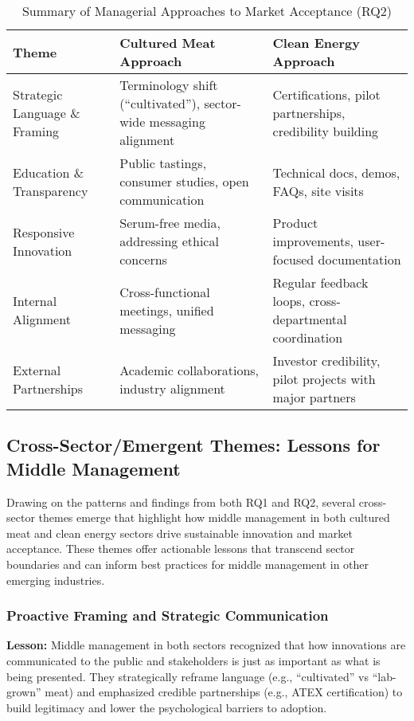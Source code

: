 \begin{table}[h!]
	\centering
	\caption{Summary of Managerial Approaches to Market Acceptance (RQ2)}
	\label{tab:rq2_summary}
	\begin{tabularx}{\textwidth}{@{}lXX@{}}
		\toprule
		\textbf{Theme} & \textbf{Cultured Meat Approach} & \textbf{Clean Energy Approach} \\
		\midrule
		Strategic Language \& Framing & Terminology shift (“cultivated”), sector-wide messaging alignment & Certifications, pilot partnerships, credibility building \\
		\addlinespace
		Education \& Transparency & Public tastings, consumer studies, open communication & Technical docs, demos, FAQs, site visits \\
		\addlinespace
		Responsive Innovation & Serum-free media, addressing ethical concerns & Product improvements, user-focused documentation \\
		\addlinespace
		Internal Alignment & Cross-functional meetings, unified messaging & Regular feedback loops, cross-departmental coordination \\
		\addlinespace
		External Partnerships & Academic collaborations, industry alignment & Investor credibility, pilot projects with major partners \\
		\bottomrule
	\end{tabularx}
\end{table}

\subsection*{Cross-Sector/Emergent Themes: Lessons for Middle Management}
Drawing on the patterns and findings from both RQ1 and RQ2, several cross-sector themes emerge that highlight how middle management in both cultured meat and clean energy sectors drive sustainable innovation and market acceptance. These themes offer actionable lessons that transcend sector boundaries and can inform best practices for middle management in other emerging industries.

\subsubsection*{Proactive Framing and Strategic Communication}
\noindent\textbf{Lesson:} Middle management in both sectors recognized that how innovations are communicated to the public and stakeholders is just as important as what is being presented. They strategically reframe language (e.g., “cultivated” vs “lab-grown” meat) and emphasized credible partnerships (e.g., ATEX certification) to build legitimacy and lower the psychological barriers to adoption.

